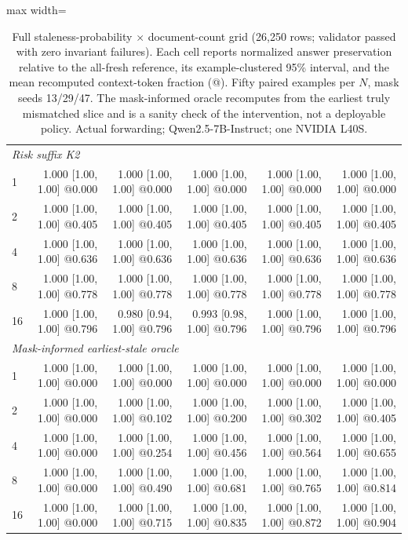 \begin{table}[t]
\begin{adjustbox}{max width=\textwidth}
\begin{tabular}{lrrrrr}
\midrule
\multicolumn{6}{l}{\emph{Risk suffix K2}} \\
1 & 1.000 [1.00, 1.00] @0.000 & 1.000 [1.00, 1.00] @0.000 & 1.000 [1.00, 1.00] @0.000 & 1.000 [1.00, 1.00] @0.000 & 1.000 [1.00, 1.00] @0.000 \\
2 & 1.000 [1.00, 1.00] @0.405 & 1.000 [1.00, 1.00] @0.405 & 1.000 [1.00, 1.00] @0.405 & 1.000 [1.00, 1.00] @0.405 & 1.000 [1.00, 1.00] @0.405 \\
4 & 1.000 [1.00, 1.00] @0.636 & 1.000 [1.00, 1.00] @0.636 & 1.000 [1.00, 1.00] @0.636 & 1.000 [1.00, 1.00] @0.636 & 1.000 [1.00, 1.00] @0.636 \\
8 & 1.000 [1.00, 1.00] @0.778 & 1.000 [1.00, 1.00] @0.778 & 1.000 [1.00, 1.00] @0.778 & 1.000 [1.00, 1.00] @0.778 & 1.000 [1.00, 1.00] @0.778 \\
16 & 1.000 [1.00, 1.00] @0.796 & 0.980 [0.94, 1.00] @0.796 & 0.993 [0.98, 1.00] @0.796 & 1.000 [1.00, 1.00] @0.796 & 1.000 [1.00, 1.00] @0.796 \\
\midrule
\multicolumn{6}{l}{\emph{Mask-informed earliest-stale oracle}} \\
1 & 1.000 [1.00, 1.00] @0.000 & 1.000 [1.00, 1.00] @0.000 & 1.000 [1.00, 1.00] @0.000 & 1.000 [1.00, 1.00] @0.000 & 1.000 [1.00, 1.00] @0.000 \\
2 & 1.000 [1.00, 1.00] @0.000 & 1.000 [1.00, 1.00] @0.102 & 1.000 [1.00, 1.00] @0.200 & 1.000 [1.00, 1.00] @0.302 & 1.000 [1.00, 1.00] @0.405 \\
4 & 1.000 [1.00, 1.00] @0.000 & 1.000 [1.00, 1.00] @0.254 & 1.000 [1.00, 1.00] @0.456 & 1.000 [1.00, 1.00] @0.564 & 1.000 [1.00, 1.00] @0.655 \\
8 & 1.000 [1.00, 1.00] @0.000 & 1.000 [1.00, 1.00] @0.490 & 1.000 [1.00, 1.00] @0.681 & 1.000 [1.00, 1.00] @0.765 & 1.000 [1.00, 1.00] @0.814 \\
16 & 1.000 [1.00, 1.00] @0.000 & 1.000 [1.00, 1.00] @0.715 & 1.000 [1.00, 1.00] @0.835 & 1.000 [1.00, 1.00] @0.872 & 1.000 [1.00, 1.00] @0.904 \\
\bottomrule
\end{tabular}
\end{adjustbox}
\caption{Full staleness-probability $\times$ document-count grid (26{,}250 rows; validator passed with zero invariant failures). Each cell reports normalized answer preservation relative to the all-fresh reference, its example-clustered 95\% interval, and the mean recomputed context-token fraction (@). Fifty paired examples per $N$, mask seeds 13/29/47. The mask-informed oracle recomputes from the earliest truly mismatched slice and is a sanity check of the intervention, not a deployable policy. Actual forwarding; Qwen2.5-7B-Instruct; one NVIDIA L40S.}
\label{tab:app-stale-full}
\end{table}
